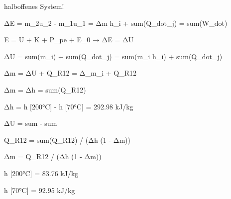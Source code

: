 halboffenes System!

ΔE = m_2u_2 - m_1u_1 = Δm h_i + sum(Q_dot_j) = sum(W_dot)

E = U + K + P_pe + E_0  →  ΔE = ΔU

ΔU = sum(m_i) + sum(Q_dot_j) = sum(m_i h_i) + sum(Q_dot_j)

Δm = ΔU + Q_R12 = Δ_m_i + Q_R12

Δm = Δh = sum(Q_R12)

Δh = h [200°C] - h [70°C] = 292.98 kJ/kg

ΔU = sum - sum

Q_R12 = sum(Q_R12) / (Δh (1 - Δm))

Δm = Q_R12 / (Δh (1 - Δm))

h [200°C] = 83.76 kJ/kg

h [70°C] = 92.95 kJ/kg